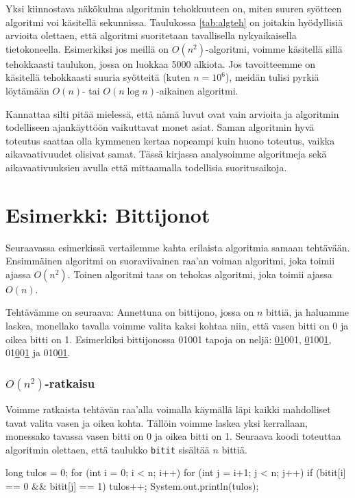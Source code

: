 Yksi kiinnostava näkökulma algoritmin tehokkuuteen on,
miten suuren syötteen algoritmi voi käsitellä sekunnissa.
Taulukossa \ref{tab:algteh} on joitakin hyödyl\-lisiä arvioita
olettaen, että algoritmi suoritetaan tavallisella nykyaikaisella tietokoneella.
Esimerkiksi jos meillä on $O(n^2)$-algoritmi, voimme käsitellä sillä
tehokkaasti taulukon, jossa on luokkaa 5000 alkiota.
Jos tavoitteemme on käsitellä tehokkaasti suuria syötteitä
(kuten $n=10^6$), meidän tulisi pyrkiä
löytä\-mään $O(n)$- tai $O(n \log n)$-aikainen algoritmi.

Kannattaa silti pitää mielessä, että nämä luvut ovat vain arvioita ja algoritmin
todelliseen ajankäyttöön vaikuttavat monet asiat.
Saman algoritmin hyvä toteutus saattaa olla
kymmenen kertaa nopeampi kuin huono toteutus,
vaikka aikavaativuudet olisivat samat.
Tässä kirjassa analysoimme algoritmeja sekä aikavaativuuksien
avulla että mittaamalla todellisia suoritusaikoja.

\section{Esimerkki: Bittijonot}

Seuraavassa esimerkissä vertailemme kahta
erilaista algoritmia samaan tehtä\-vään.
Ensimmäinen algoritmi on suoraviivainen raa'an voiman
algoritmi, joka toimii ajassa $O(n^2)$.
Toinen algoritmi taas on tehokas algoritmi,
joka toimii ajassa $O(n)$.

Tehtävämme on seuraava: Annettuna on bittijono, jossa on $n$ bittiä,
ja haluamme laskea, monellako tavalla voimme valita kaksi kohtaa
niin, että vasen bitti on 0 ja oikea bitti on 1.
Esimerkiksi bittijonossa 01001 tapoja on neljä:
\underline{01}001, \underline{0}100\underline{1},
01\underline{0}0\underline{1} ja 010\underline{01}.

\subsubsection{$O(n^2)$-ratkaisu}

Voimme ratkaista tehtävän raa'alla voimalla
käymällä läpi kaikki mahdolliset tavat valita vasen ja oikea kohta.
Tällöin voimme laskea yksi kerrallaan,
monessako tavassa vasen bitti on 0 ja oikea bitti on 1.
Seuraava koodi toteuttaa algoritmin olettaen,
että taulukko \texttt{bitit} sisältää $n$ bittiä.

\begin{code}
long tulos = 0;
for (int i = 0; i < n; i++) {
    for (int j = i+1; j < n; j++) {
        if (bitit[i] == 0 && bitit[j] == 1) tulos++;
    }
 }
System.out.println(tulos);
\end{code}

